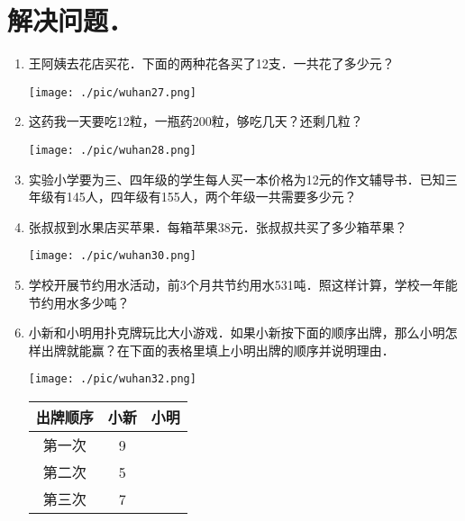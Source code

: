 \documentclass[12pt,twoside,space]{ctexart}
\begin{document}
    \section{解决问题．}
          \begin{enumerate}[itemsep=3em,topsep=0pt,resume]
            \item 王阿姨去花店买花．下面的两种花各买了12支．一共花了多少元？\\[0.5em]
              \begin{minipage}{\textwidth}
                \texttt{[image: ./pic/wuhan27.png]}
              \end{minipage}

            \item 这药我一天要吃12粒，一瓶药200粒，够吃几天？还剩几粒？\\[0.5em]
              \begin{minipage}{\textwidth}
                \texttt{[image: ./pic/wuhan28.png]}
              \end{minipage}
            
            \item 实验小学要为三、四年级的学生每人买一本价格为12元的作文辅导书．已知三年级有145人，四年级有155人，两个年级一共需要多少元？
            \item 张叔叔到水果店买苹果．每箱苹果38元．张叔叔共买了多少箱苹果？\\[0.5em]
              \begin{minipage}{\textwidth}
                \texttt{[image: ./pic/wuhan30.png]}
              \end{minipage}

            \item 学校开展节约用水活动，前3个月共节约用水531吨．照这样计算，学校一年能节约用水多少吨？
            \item 小新和小明用扑克牌玩比大小游戏．如果小新按下面的顺序出牌，那么小明怎样出牌就能赢？在下面的表格里填上小明出牌的顺序并说明理由．\\[0.5em]
              \begin{minipage}{\textwidth}
                \texttt{[image: ./pic/wuhan32.png]}
              \end{minipage}
              
                \begin{tabular}{|c|c|c|}
                \hline
                出牌顺序 \hspace{2em} & 小新 \hspace{2em} & 小明 \hspace{2em} \\ \hline
                第一次 & 9 &  \\ \hline
                第二次 & 5 &  \\ \hline
                第三次 & 7 &  \\ \hline
                \end{tabular}
          \end{enumerate}
\end{document}

